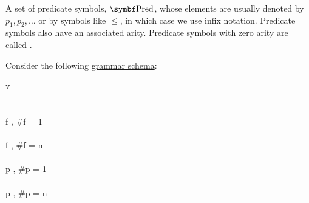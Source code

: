 \begin{definition}
\begin{description}
\begin{DefEnum}[resume=def:first_order_logic_alphabet]
       A set of predicate symbols, \( \Bold{Pred} \), whose elements are usually denoted by \( p_1, p_2, \ldots \) or by symbols like \( \leq \), in which case we use infix notation. Predicate symbols also have an associated arity. Predicate symbols with zero arity are called .
    \end{DefEnum}
  \end{description}
\end{definition}

\begin{definition}\label{def:first_order_language}\mbox{}
  \begin{DefEnum}
     Consider the following \hyperref[def:backus_naur_form]{grammar schema}:
    \begin{bnf*}
              {v \in {}} \\
            {\circ \in \Sigma} \\
            {\bnfts{\( \forall \)} \bnfor \bnfts{\( \exists \)}} \\
        {f \in {}, \#f = 1} \\
      \bnfmore                  {\vdots} \\
        {f \in {}, \#f = n } \\
      \bnfmore                  {\vdots} \\
       {p \in {}, \#p = 1} \\
      \bnfmore                  {\vdots} \\
       {p \in {}, \#p = n } \\
      \bnfmore                  {\vdots} \\
                  { \bnfor} \\
       \\
      \bnfmore                  {\hspace{3cm} \vdots} \\
       \\

\end{bnf*}
\end{DefEnum}
\end{definition}
